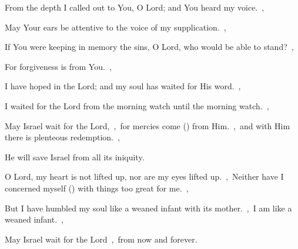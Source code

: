 \documentclass[12pt,twoside,a5paper]{article}
\begin{document}
\begin{normalparskip}
  From the depth I called out to You, O Lord; and You heard my voice.~\sep

  May Your ears be attentive to the voice of my supplication.~\sep


  If You were keeping in memory the sins, O Lord, who would be able to stand?~\sep

  For forgiveness is from You.~\sep

  I have hoped in the Lord; and my soul has waited for His word.~\sep

  I waited for the Lord from the morning watch until the morning watch.~\sep

  May Israel wait for the Lord,~\sep\ for mercies come () from Him.~\sep\ and with Him there is plenteous redemption.~\sep

  He will save Israel from all its iniquity.
\end{normalparskip}


\begin{normalparskip}
  O Lord, my heart is not lifted up, nor are my eyes lifted up.~\sep\ Neither have I concerned myself () with things too great for me.~\sep


  But I have humbled my soul like a weaned infant with its mother.~\sep\ I am like a weaned infant.~\sep

  May Israel wait for the Lord~\sep\ from now and forever.
\end{normalparskip}





\end{document}
